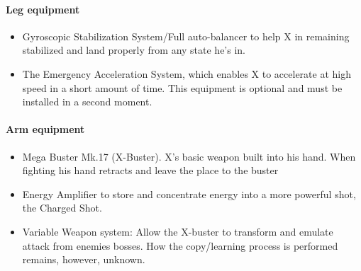 \paragraph{Leg equipment}
\begin{itemize}
	\item Gyroscopic Stabilization System/Full auto-balancer to help X in remaining stabilized and land properly from any state he's in.
	\item The Emergency Acceleration System, which enables X to accelerate at high speed in a short amount of time. This equipment is optional and must be installed in a second moment.
\end{itemize}

\paragraph{Arm equipment}
\begin{itemize}
	\item Mega Buster Mk.17 (X-Buster). X’s basic weapon built into his hand. When fighting his hand retracts and leave the place to the buster~\cite{elysium_weapons}
	\item Energy Amplifier to store and concentrate energy into a more powerful shot, the Charged Shot.
	\item Variable Weapon system: Allow the X-buster to transform and emulate attack from enemies bosses. How the copy/learning process is performed remains, however, unknown.
\end{itemize}


